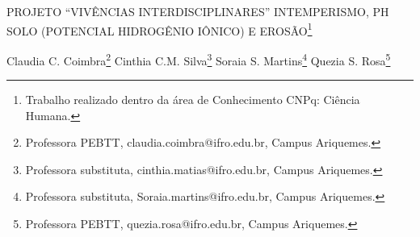 \documentclass[article,12pt,onesidea,4paper,english,brazil]{abntex2}
\begin{document}
	
	
	\frenchspacing 
	
	\begin{center}
		\LARGE PROJETO “VIVÊNCIAS INTERDISCIPLINARES”
		INTEMPERISMO, PH SOLO (POTENCIAL HIDROGÊNIO IÔNICO) E EROSÃO\footnote{Trabalho realizado dentro da área de Conhecimento CNPq: Ciência Humana.}
		
		\normalsize
	Claudia C. Coimbra\footnote{Professora PEBTT, claudia.coimbra@ifro.edu.br, Campus Ariquemes.} 
	Cinthia C.M. Silva\footnote{Professora substituta, cinthia.matias@ifro.edu.br, Campus Ariquemes.} 
	Soraia S. Martins\footnote{Professora substituta, Soraia.martins@ifro.edu.br, Campus Ariquemes.} 
	Quezia S. Rosa\footnote{Professora PEBTT, quezia.rosa@ifro.edu.br, Campus Ariquemes.} 
	\end{center}
	
\end{document}
